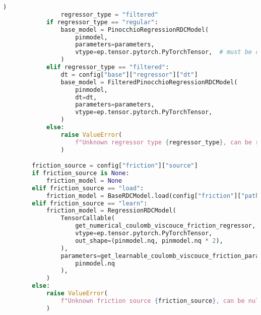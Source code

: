 \begin{lstlisting}[language=python, caption=\raggedright{identification/full.py}, frame=single]
                )
                regressor_type = "filtered"
            if regressor_type == "regular":
                base_model = PinocchioRegressionRDCModel(
                    pinmodel,
                    parameters=parameters,
                    vtype=ep.tensor.pytorch.PyTorchTensor,  # must be consistent with type parameters
                )
            elif regressor_type == "filtered":
                dt = config["base"]["regressor"]["dt"]
                base_model = FilteredPinocchioRegressionRDCModel(
                    pinmodel,
                    dt=dt,
                    parameters=parameters,
                    vtype=ep.tensor.pytorch.PyTorchTensor,
                )
            else:
                raise ValueError(
                    f"Unknown regressor type {regressor_type}, can be regular or filtered"
                )

        friction_source = config["friction"]["source"]
        if friction_source is None:
            friction_model = None
        elif friction_source == "load":
            friction_model = BaseRDCModel.load(config["friction"]["path"])
        elif friction_source == "learn":
            friction_model = RegressionRDCModel(
                TensorCallable(
                    get_numerical_coulomb_viscouce_friction_regressor,
                    vtype=ep.tensor.pytorch.PyTorchTensor,
                    out_shape=(pinmodel.nq, pinmodel.nq * 2),
                ),
                parameters=get_learnable_coulomb_viscouce_friction_parameters(
                    pinmodel.nq
                ),
            )
        else:
            raise ValueError(
                f"Unknown friction source {friction_source}, can be null, load or learn"
            )


\end{lstlisting}
